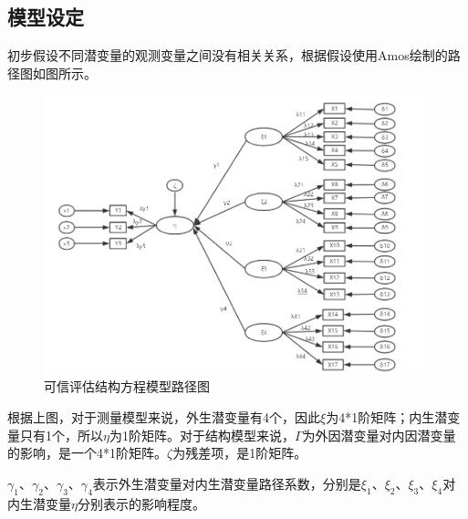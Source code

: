 \subsection{模型设定}
初步假设不同潜变量的观测变量之间没有相关关系，根据假设使用Amos绘制的路径图如图所示。
\begin{figure}[htb]
	\centering
	\includegraphics[width=13cm]{fig/3_02.png}
	\caption{可信评估结构方程模型路径图}
	\label{fig:3_02}
\end{figure}

根据上图，对于测量模型来说，外生潜变量有4个，因此$\xi$为4*1阶矩阵；内生潜变量只有1个，所以$\eta$为1阶矩阵。对于结构模型来说，$\Gamma$为外因潜变量对内因潜变量的影响，是一个4*1阶矩阵。$\zeta$为残差项，是1阶矩阵\cite{赵怡晴2016产品质量风险监控绩效评估的结构方程模型}。

$\gamma_1、\gamma_2、\gamma_3、\gamma_4$表示外生潜变量对内生潜变量路径系数，分别是$\xi_1、\xi_2、\xi_3、\xi_4$对内生潜变量$\eta$分别表示的影响程度。

